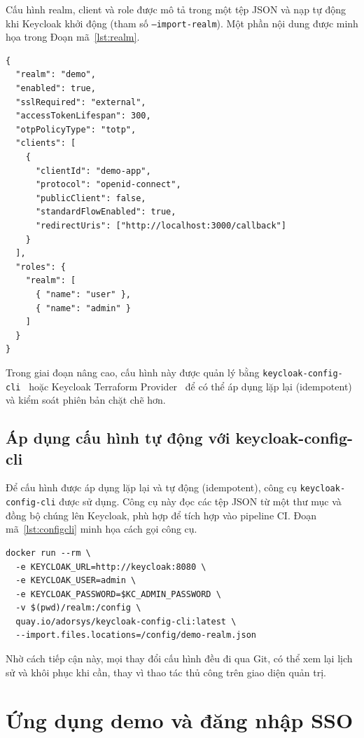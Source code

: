 Cấu hình realm, client và role được mô tả trong một tệp JSON và nạp tự động
khi Keycloak khởi động (tham số \texttt{--import-realm}). Một phần nội dung
được minh họa trong Đoạn mã~\ref{lst:realm}.

\begin{lstlisting}[caption={Trích tệp cấu hình realm dưới dạng mã nguồn},label={lst:realm}]
{
  "realm": "demo",
  "enabled": true,
  "sslRequired": "external",
  "accessTokenLifespan": 300,
  "otpPolicyType": "totp",
  "clients": [
    {
      "clientId": "demo-app",
      "protocol": "openid-connect",
      "publicClient": false,
      "standardFlowEnabled": true,
      "redirectUris": ["http://localhost:3000/callback"]
    }
  ],
  "roles": {
    "realm": [
      { "name": "user" },
      { "name": "admin" }
    ]
  }
}
\end{lstlisting}

Trong giai đoạn nâng cao, cấu hình này được quản lý bằng
\texttt{keycloak-config-cli}~\cite{kc-config-cli} hoặc Keycloak Terraform
Provider~\cite{tf-keycloak} để có thể áp dụng lặp lại (idempotent) và kiểm soát
phiên bản chặt chẽ hơn.

\subsection{Áp dụng cấu hình tự động với keycloak-config-cli}
\label{subsec:configcli}

Để cấu hình được áp dụng lặp lại và tự động (idempotent), công cụ
\texttt{keycloak-config-cli} được sử dụng. Công cụ này đọc các tệp JSON từ một
thư mục và đồng bộ chúng lên Keycloak, phù hợp để tích hợp vào pipeline CI.
Đoạn mã~\ref{lst:configcli} minh họa cách gọi công cụ.

\begin{lstlisting}[caption={Áp dụng cấu hình realm bằng keycloak-config-cli},label={lst:configcli}]
docker run --rm \
  -e KEYCLOAK_URL=http://keycloak:8080 \
  -e KEYCLOAK_USER=admin \
  -e KEYCLOAK_PASSWORD=$KC_ADMIN_PASSWORD \
  -v $(pwd)/realm:/config \
  quay.io/adorsys/keycloak-config-cli:latest \
  --import.files.locations=/config/demo-realm.json
\end{lstlisting}

Nhờ cách tiếp cận này, mọi thay đổi cấu hình đều đi qua Git, có thể xem lại
lịch sử và khôi phục khi cần, thay vì thao tác thủ công trên giao diện quản trị.

\section{Ứng dụng demo và đăng nhập SSO}
\label{sec:appdemo}

